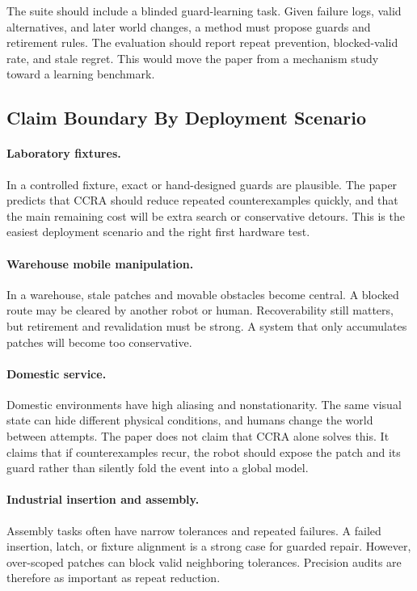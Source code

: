 \documentclass{article}
\newcommand{\ccra}{\textsc{CCRA}}
\begin{document}
The suite should include a blinded guard-learning task. Given failure logs,
valid alternatives, and later world changes, a method must propose guards and
retirement rules. The evaluation should report repeat prevention, blocked-valid
rate, and stale regret. This would move the paper from a mechanism study toward
a learning benchmark.

\subsection{Claim Boundary By Deployment Scenario}

\paragraph{Laboratory fixtures.}
In a controlled fixture, exact or hand-designed guards are plausible. The paper
predicts that \ccra{} should reduce repeated counterexamples quickly, and that
the main remaining cost will be extra search or conservative detours. This is
the easiest deployment scenario and the right first hardware test.

\paragraph{Warehouse mobile manipulation.}
In a warehouse, stale patches and movable obstacles become central. A blocked
route may be cleared by another robot or human. Recoverability still matters,
but retirement and revalidation must be strong. A system that only accumulates
patches will become too conservative.

\paragraph{Domestic service.}
Domestic environments have high aliasing and nonstationarity. The same visual
state can hide different physical conditions, and humans change the world
between attempts. The paper does not claim that \ccra{} alone solves this. It
claims that if counterexamples recur, the robot should expose the patch and its
guard rather than silently fold the event into a global model.

\paragraph{Industrial insertion and assembly.}
Assembly tasks often have narrow tolerances and repeated failures. A failed
insertion, latch, or fixture alignment is a strong case for guarded repair.
However, over-scoped patches can block valid neighboring tolerances. Precision
audits are therefore as important as repeat reduction.
\end{document}
